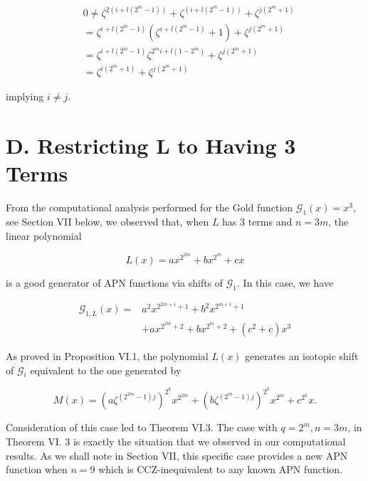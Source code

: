\documentclass[10pt]{article}
\begin{document}
$$
\begin{aligned}
& 0 \neq \zeta^{2\left(i+l\left(2^{m}-1\right)\right)}+\zeta^{\left(i+l\left(2^{m}-1\right)\right)}+\zeta^{j\left(2^{m}+1\right)} \\
&=\zeta^{i+l\left(2^{m}-1\right)}\left(\zeta^{i+l\left(2^{m}-1\right)}+1\right)+\zeta^{j\left(2^{m}+1\right)} \\
&=\zeta^{i+l\left(2^{m}-1\right)} \zeta^{2^{m} i+l\left(1-2^{m}\right)}+\zeta^{j\left(2^{m}+1\right)} \\
&=\zeta^{i\left(2^{m}+1\right)}+\zeta^{j\left(2^{m}+1\right)}
\end{aligned}
$$

implying $i \neq j$.

\section*{D. Restricting L to Having 3 Terms}
From the computational analysis performed for the Gold function $\mathcal{G}_{1}(x)=x^{3}$, see Section VII below, we observed that, when $L$ has 3 terms and $n=3 m$, the linear polynomial


\begin{equation*}
L(x)=a x^{2^{2 m}}+b x^{2^{m}}+c x \tag{15}
\end{equation*}


is a good generator of APN functions via shifts of $\mathcal{G}_{1}$. In this case, we have


\begin{align*}
\mathcal{G}_{1, L}(x)= & a^{2} x^{2^{2 m+1}+1}+b^{2} x^{2^{m+1}+1}  \tag{16}\\
& +a x^{2^{2 m}+2}+b x^{2^{m}+2}+\left(c^{2}+c\right) x^{3}
\end{align*}


As proved in Proposition VI.1, the polynomial $L(x)$ generates an isotopic shift of $\mathcal{G}_{i}$ equivalent to the one generated by


\begin{equation*}
M(x)=\left(a \zeta^{\left(2^{2 m}-1\right) j}\right)^{2^{k}} x^{2^{2 m}}+\left(b \zeta^{\left(2^{m}-1\right) j}\right)^{2^{k}} x^{2^{m}}+c^{2^{k}} x . \tag{17}
\end{equation*}


Consideration of this case led to Theorem VI.3. The case with $q=2^{m}, n=3 m$, in Theorem VI. 3 is exactly the situation that we observed in our computational results. As we shall note in Section VII, this specific case provides a new APN function when $n=9$ which is CCZ-inequivalent to any known APN function.
\end{document}
